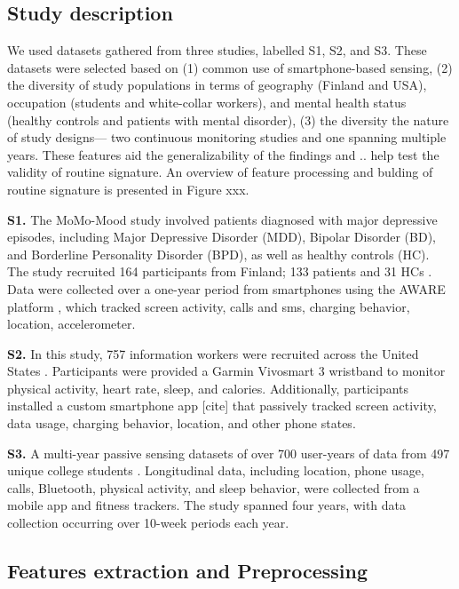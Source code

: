\documentclass[pdflatex,sn-vancouver,Numbered]{bst/sn-jnl}%
\theoremstyle{thmstyleone}%
\theoremstyle{thmstyletwo}%
\theoremstyle{thmstylethree}%
\begin{document}
\subsection*{Study description}\label{sec:methods:study_desc}  

We used datasets gathered from three studies, labelled S1, S2, and S3. These datasets were selected based on (1) common use of smartphone-based sensing, (2) the diversity of study populations in terms of geography (Finland and USA), occupation (students and white-collar workers), and mental health status (healthy controls and patients with mental disorder), (3) the diversity the nature of study designs— two continuous monitoring studies and one spanning multiple years. These features aid the generalizability of the findings and .. help test the validity of routine signature. An overview of feature processing and bulding of routine signature is presented in Figure xxx.

\textbf{S1.} The MoMo-Mood study involved patients diagnosed with major depressive episodes, including Major Depressive Disorder (MDD), Bipolar Disorder (BD), and Borderline Personality Disorder (BPD), as well as healthy controls (HC). The study recruited 164 participants from Finland; 133 patients and 31 HCs \cite{aledavood2025multimodal}. Data were collected over a one-year period from smartphones using the AWARE platform \cite{ferreiraAWAREMobileContext2015}, which tracked screen activity, calls and sms, charging behavior, location, accelerometer.

\textbf{S2.} In this study, 757 information workers were recruited across the United States \cite{mattingly2019tesserae}. Participants were provided a Garmin Vivosmart 3 wristband to monitor physical activity, heart rate, sleep, and calories. Additionally, participants installed a custom smartphone app [cite] that passively tracked screen activity, data usage, charging behavior, location, and other phone states.

\textbf{S3.} A multi-year passive sensing datasets of over 700 user-years of data from 497 unique college students \cite{xu2022globem}. Longitudinal data, including location, phone usage, calls, Bluetooth, physical activity, and sleep behavior, were collected from a mobile app and fitness trackers. The study spanned four years, with data collection occurring over 10-week periods each year. 


\subsection*{Features extraction and Preprocessing}\label{sec:methods:features_extraction}  
\end{document}
